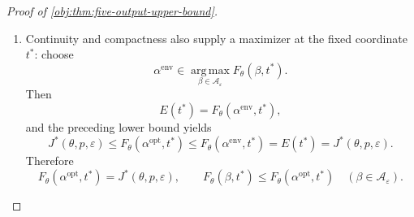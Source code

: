 \documentclass[11pt]{article}
\begin{document}
\begin{proof}[Proof of \cref{obj:thm:five-output-upper-bound}]
\begin{enumerate}
Define the profiled objective on this set by
\[
\Phi(\beta):=\inf_{t\in\mathbb R}F_\theta(\beta,t),
\qquad \beta\in\mathcal A_\varepsilon.
\]
Nonnegativity of the weights and positivity of the denominators give
\[
0\le\Phi(\beta)\le F_\theta(\beta,0)<\infty.
\]
For each fixed \(t\), \(F_\theta(\,\cdot\,,t)\) is continuous.
Its infimum over \(t\) is therefore upper semicontinuous.
The maximum of \(\Phi\) on the nonempty compact feasible set is attained.
Using the optimized value in \cref{obj:def:staircase-saddle}, choose
\(\alpha^{\mathrm{opt}}\in\mathcal A_\varepsilon\) with
\[
\Phi(\alpha^{\mathrm{opt}})
=J^*(\theta,p,\varepsilon).
\]
In particular,
\[
J^*(\theta,p,\varepsilon)
\le F_\theta(\alpha^{\mathrm{opt}},t)
\qquad(t\in\mathbb R).
\]

\item
Continuity and compactness also supply a maximizer at the fixed
coordinate \(t^*\): choose
\[
\alpha^{\mathrm{env}}
\in\operatorname*{arg\,max}_{\beta\in\mathcal A_\varepsilon}
F_\theta(\beta,t^*).
\]
Then
\[
E(t^*)=F_\theta(\alpha^{\mathrm{env}},t^*),
\]
and the preceding lower bound yields
\[
J^*(\theta,p,\varepsilon)
\le F_\theta(\alpha^{\mathrm{opt}},t^*)
\le F_\theta(\alpha^{\mathrm{env}},t^*)
=E(t^*)
=J^*(\theta,p,\varepsilon).
\]
Therefore
\[
F_\theta(\alpha^{\mathrm{opt}},t^*)
=J^*(\theta,p,\varepsilon),
\qquad
F_\theta(\beta,t^*)
\le F_\theta(\alpha^{\mathrm{opt}},t^*)
\quad(\beta\in\mathcal A_\varepsilon).
\]


\end{enumerate}
\end{proof}
\end{document}
